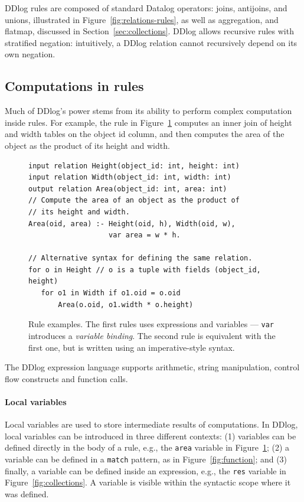 DDlog rules are composed of standard Datalog operators: joins, antijoins, and
unions, illustrated in Figure~\ref{fig:relations-rules}, as
well as aggregation, and flatmap, discussed in Section~\ref{sec:collections}.
DDlog allows recursive rules with stratified negation: intuitively, a DDlog
relation cannot recursively depend on its own negation.

\subsection{Computations in rules}

Much of DDlog's power stems from its ability to perform complex
computation inside rules.  For example, the rule in
Figure~\ref{fig:area} computes an inner join of height and width
tables on the object id column, and then computes the area of the
object as the product of its height and width.

\begin{figure}[t]
  \footnotesize
  \begin{lstlisting}[language=ddlog]
input relation Height(object_id: int, height: int)
input relation Width(object_id: int, width: int)
output relation Area(object_id: int, area: int)
// Compute the area of an object as the product of
// its height and width.
Area(oid, area) :- Height(oid, h), Width(oid, w),
                   var area = w * h.

// Alternative syntax for defining the same relation.
for o in Height // o is a tuple with fields (object_id, height)
   for o1 in Width if o1.oid = o.oid
       Area(o.oid, o1.width * o.height)
  \end{lstlisting}
  \caption{Rule examples.  The first rules uses expressions and
    variables --- \texttt{var} introduces a \emph{variable binding}.
    The second rule is equivalent with the first one, but is written
    using an imperative-style syntax.\label{fig:area}}
\end{figure}

The DDlog expression language supports arithmetic, string
manipulation, control flow constructs and function calls.

\paragraph{Local variables}
Local variables are used to store intermediate results of
computations.  In DDlog, local variables can be introduced in three
different contexts: (1) variables can be defined directly in the body
of a rule, e.g., the \texttt{area} variable in Figure~\ref{fig:area};
(2) a variable can be defined in a \texttt{match} pattern, as in
Figure~\ref{fig:function}; and (3) finally, a variable can be defined
inside an expression, e.g., the \texttt{res} variable in
Figure~\ref{fig:collections}.  A variable is visible within the
syntactic scope where it was defined.

